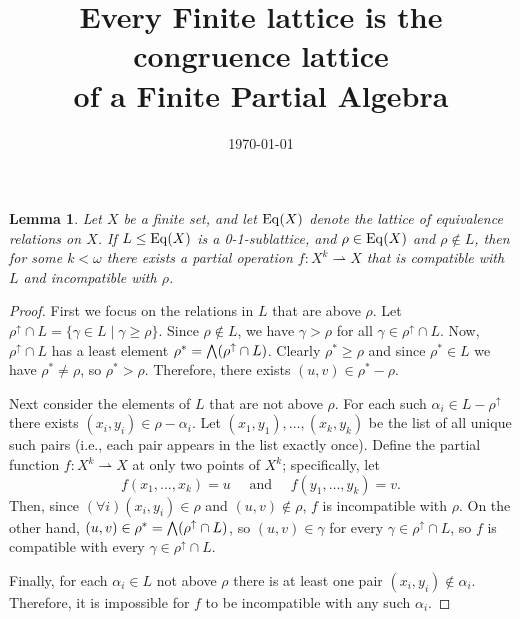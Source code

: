 \documentclass[11pt]{amsart}
\numberwithin{equation}{section}
\theoremstyle{plain}
\newtheorem{lemma}[theorem]{Lemma}
\theoremstyle{definition}
\begin{document}
\title[Partial Algebras]{Every Finite lattice is the congruence lattice\\
of a Finite Partial Algebra}
\date{\today}
\address{University of Hawaii}
\address{Chapman University}


\maketitle



\begin{lemma}
Let $X$ be a finite set, and let $\operatorname{Eq}(X)$ denote the lattice of equivalence
relations on $X$. If $L\leq \operatorname{Eq}(X)$ is a 0-1-sublattice,
and $\rho \in \operatorname{Eq}(X)$ and $\rho \notin L$, then for some $k < \omega$ there exists a partial
operation $f\colon X^k \rightharpoonup X$ that is compatible with $L$ and
incompatible with $\rho$.
\end{lemma}
\begin{proof}
  First we focus on the relations in $L$ that are above $\rho$.
  Let $\rho^\uparrow \cap L = \{\gamma \in L \mid \gamma \geq \rho\}$.
  Since $\rho\notin L$, we have $\gamma > \rho$ for all $\gamma \in \rho^\uparrow \cap L$.
  Now, $\rho^\uparrow \cap L$ has a least element
  $\rho^* = \bigwedge (\rho^\uparrow \cap L)$.  Clearly
  $\rho^*\geq \rho$ and since $\rho^* \in L$ we have
  $\rho^*\neq \rho$, so
  $\rho^* > \rho$.  Therefore, there exists $(u,v) \in \rho^* - \rho$.

  Next consider the elements of $L$ that are not above $\rho$. For each such
  $\alpha_i \in L - \rho^\uparrow$ there exists $(x_i, y_i) \in \rho -\alpha_i$.
  Let $(x_1, y_1), \dots, (x_k, y_k)$ be the list of all unique such pairs
  (i.e., each pair appears in the list exactly once).
  Define the partial function $f\colon X^k \rightharpoonup X$ at only two points of $X^k$; specifically, let
  \[ f(x_1, \dots, x_k) = u \quad \text{ and } \quad f(y_1, \dots, y_k) = v. \]
  Then, since $(\forall i)(x_i, y_i) \in \rho$ and $(u,v) \notin \rho$, 
  $f$ is incompatible with $\rho$.  On the other hand,
  $(u,v) \in  \rho^* = \bigwedge (\rho^\uparrow \cap L)$, so
  $(u,v) \in \gamma$  for every $\gamma \in \rho^\uparrow \cap L$, so
  $f$ is compatible with every $\gamma \in \rho^\uparrow \cap L$.
  
  
  Finally, for each $\alpha_i\in L$ not above $\rho$ there is at least one pair
  $(x_i, y_i)\notin \alpha_i$.  Therefore, it is impossible for $f$ to be
  incompatible with any such $\alpha_i$. 
\end{proof}
\end{document}
